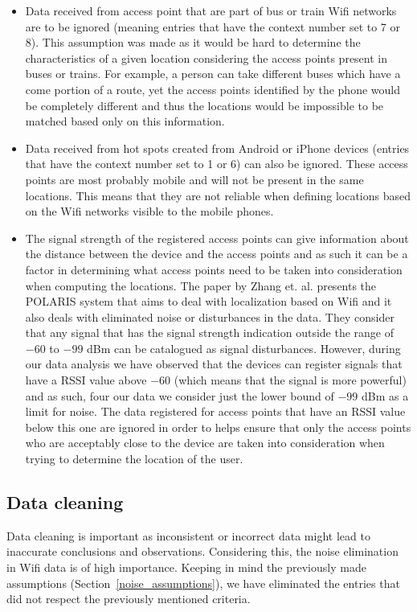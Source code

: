 \begin{itemize}
  \item Data received from access point that are part of bus or train Wifi
  networks are to be ignored (meaning entries that have the context number set
  to 7 or 8). This assumption was made as it would be hard to determine the
  characteristics of a given location considering the access points present in
  buses or trains. For example, a person can take different buses which have a
  come portion of a route, yet the access points identified by the phone would
  be completely different and thus the locations would be impossible to be
  matched based only on this information.
  \item Data received from hot spots created from Android or iPhone devices
  (entries that have the context number set to 1 or 6) can also be ignored.
  These access points are most probably mobile and will not be present in the
  same locations. This means that they are not reliable when defining locations
  based on the Wifi networks visible to the mobile phones.
  \item The signal strength of the registered access points can give
  information about the distance between the device and the access points and
  as such it can be a factor in determining what access points need to be
  taken into consideration when computing the locations. The paper by Zhang
  et. al. \cite{zhang2012polaris} presents the POLARIS system that aims to deal
  with localization based on Wifi and it also deals with eliminated noise or
  disturbances in the data. They consider that any signal that has the signal
  strength indication outside the range of $-60$ to $-99$ dBm can be catalogued
  as signal disturbances. However, during our data analysis we have observed that
  the devices can register signals that have a RSSI value above $-60$ (which
  means that the signal is more powerful) and as such, four our data we
  consider just the lower bound of $-99$ dBm as a limit for noise. The data
  registered for access points that have an RSSI value below this one are
  ignored in order to helps ensure that only the access points who are
  acceptably close to the device are taken into consideration when trying to
  determine the location of the user.
\end{itemize}

\subsection{Data cleaning}
Data cleaning is important as inconsistent or incorrect data might lead to
inaccurate conclusions and observations. Considering this, the noise elimination
in Wifi data is of high importance. Keeping in mind the previously made
assumptions (Section~\ref{noise_assumptions}), we have eliminated the entries
that did not respect the previously mentioned criteria. 

